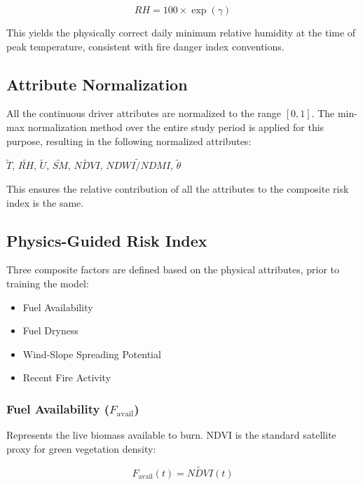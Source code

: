 \documentclass[conference]{IEEEtran}
\begin{document}
\begin{equation}
\mathit{RH} = 100 \times \exp\!\left(\gamma\right)
\end{equation}

This yields the physically correct daily minimum relative humidity at the time of
peak temperature, consistent with fire danger index conventions.

\subsection{Attribute Normalization}

All the continuous driver attributes are normalized to the range $[0, 1]$. The min-max normalization method over the entire study period is applied for this purpose, resulting in the following normalized attributes:

$\tilde{T}$, $\widetilde{RH}$, $\tilde{U}$, $\widetilde{SM}$, $\widetilde{NDVI}$, $\widetilde{NDWI/NDMI}$, $\tilde{\theta}$

This ensures the relative contribution of all the attributes to the composite risk index is the same.

\subsection{Physics-Guided Risk Index}

Three composite factors are defined based on the physical attributes, prior to training the model:

\begin{itemize}
\item Fuel Availability
\item Fuel Dryness
\item Wind-Slope Spreading Potential
\item Recent Fire Activity
\end{itemize}

\subsubsection{Fuel Availability ($F_{\mathrm{avail}}$)}

Represents the live biomass available to burn. NDVI is the standard satellite proxy
for green vegetation density:

\begin{equation}
F_{\mathrm{avail}}(t) = \widetilde{\mathit{NDVI}}(t)
\end{equation}
\end{document}

